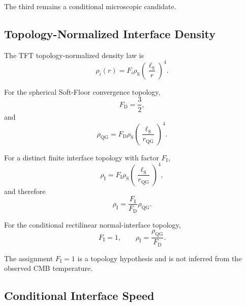 The third remains a conditional microscopic candidate.


\subsection{Topology-Normalized Interface Density}

The TFT topology-normalized density law is
\begin{equation}
    \rho_i(r)
    =
    F_i\rho_{\mathrm S}
    \left(
        \frac{\ell_{\mathrm S}}{r}
    \right)^4.
    \label{eq:AT_topology_density_law}
\end{equation}

For the spherical Soft-Floor convergence topology,
\begin{equation}
    F_{\mathrm D}
    =
    \frac{3}{2},
    \label{eq:AT_FD}
\end{equation}
and
\begin{equation}
    \rho_{\mathrm{QG}}
    =
    F_{\mathrm D}
    \rho_{\mathrm S}
    \left(
        \frac{\ell_{\mathrm S}}{r_{\mathrm{QG}}}
    \right)^4.
    \label{eq:AT_rhoQG}
\end{equation}

For a distinct finite interface topology with factor
\(F_{\mathrm I}\),
\begin{equation}
    \rho_{\mathrm I}
    =
    F_{\mathrm I}
    \rho_{\mathrm S}
    \left(
        \frac{\ell_{\mathrm S}}{r_{\mathrm{QG}}}
    \right)^4,
\end{equation}
and therefore
\begin{equation}
    \rho_{\mathrm I}
    =
    \frac{F_{\mathrm I}}{F_{\mathrm D}}
    \rho_{\mathrm{QG}}.
    \label{eq:AT_interface_density_ratio}
\end{equation}

For the conditional rectilinear normal-interface topology,
\begin{equation}
    F_{\mathrm I}
    =
    1,
    \qquad
    \rho_{\mathrm I}
    =
    \frac{\rho_{\mathrm{QG}}}{F_{\mathrm D}}.
    \label{eq:AT_interface_FI1}
\end{equation}

The assignment
\(F_{\mathrm I}=1\)
is a topology hypothesis and is not inferred from the observed CMB
temperature.


\subsection{Conditional Interface Speed}

